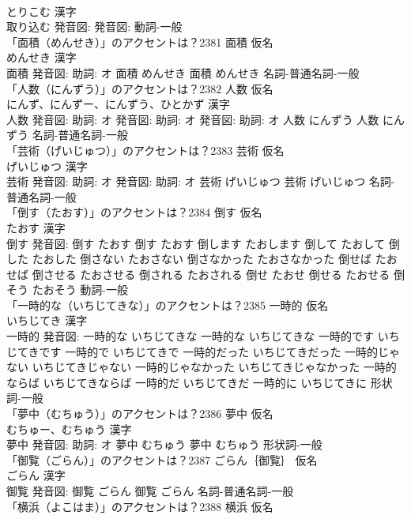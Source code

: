 \documentclass[8pt]{extreport}
\begin{document}
\begin{CJK}{UTF8}{min}
\\	とりこむ 漢字　
\\	取り込む 発音図: 発音図:							動詞-一般 
\\	「面積（めんせき）」のアクセントは？2381	面積 仮名　
\\	めんせき 漢字　
\\	面積 発音図: 助詞: オ	面積 めんせき		面積 めんせき				名詞-普通名詞-一般 
\\	「人数（にんずう）」のアクセントは？2382	人数 仮名　
\\	にんず、にんずー、にんずう、ひとかず 漢字　
\\	人数 発音図: 助詞: オ 発音図: 助詞: オ 発音図: 助詞: オ	人数 にんずう		人数 にんずう				名詞-普通名詞-一般 
\\	「芸術（げいじゅつ）」のアクセントは？2383	芸術 仮名　
\\	げいじゅつ 漢字　
\\	芸術 発音図: 助詞: オ 発音図: 助詞: オ	芸術 げいじゅつ		芸術 げいじゅつ				名詞-普通名詞-一般 
\\	「倒す（たおす）」のアクセントは？2384	倒す 仮名　
\\	たおす 漢字　
\\	倒す 発音図:	倒す たおす		倒す たおす 倒します たおします 倒して たおして 倒した たおした 倒さない たおさない 倒さなかった たおさなかった 倒せば たおせば 倒させる たおさせる 倒される たおされる 倒せ たおせ 倒せる たおせる 倒そう たおそう				動詞-一般 
\\	「一時的な（いちじてきな）」のアクセントは？2385	一時的 仮名　
\\	いちじてき 漢字　
\\	一時的 発音図:	一時的な いちじてきな		一時的な いちじてきな 一時的です いちじてきです 一時的で いちじてきで 一時的だった いちじてきだった 一時的じゃない いちじてきじゃない 一時的じゃなかった いちじてきじゃなかった 一時的ならば いちじてきならば 一時的だ いちじてきだ 一時的に いちじてきに				形状詞-一般 
\\	「夢中（むちゅう）」のアクセントは？2386	夢中 仮名　
\\	むちゅー、むちゅう 漢字　
\\	夢中 発音図: 助詞: オ	夢中 むちゅう		夢中 むちゅう				形状詞-一般 
\\	「御覧（ごらん）」のアクセントは？2387	ごらん｛御覧｝ 仮名　
\\	ごらん 漢字　
\\	御覧 発音図:	御覧 ごらん		御覧 ごらん				名詞-普通名詞-一般 
\\	「横浜（よこはま）」のアクセントは？2388	横浜 仮名　

\end{CJK}
\end{document}
